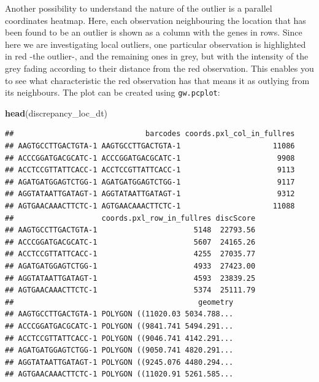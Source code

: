 \documentclass[
]{book}
\newenvironment{Shaded}{\begin{snugshade}}{\end{snugshade}}
\newcommand{\FunctionTok}[1]{\textcolor[rgb]{0.13,0.29,0.53}{\textbf{#1}}}
\newcommand{\NormalTok}[1]{#1}
\begin{document}
Another possibility to understand the nature of the outlier is a parallel coordinates heatmap. Here, each observation neighbouring the location that has been found to be an outlier is shown as a column with the genes in rows. Since here we are investigating local outliers, one particular observation is highlighted in red -the outlier-, and the remaining ones in grey, but with the intensity of the grey fading according to their distance from the red observation. This enables you to see what characteristic the red observation has that means it as outlying from its neighbours. The plot can be created using \texttt{gw.pcplot}:

\begin{Shaded}
\begin{Highlighting}[]
\FunctionTok{head}\NormalTok{(discrepancy\_loc\_dt)}
\end{Highlighting}
\end{Shaded}

\begin{verbatim}
##                              barcodes coords.pxl_col_in_fullres
## AAGTGCCTTGACTGTA-1 AAGTGCCTTGACTGTA-1                     11086
## ACCCGGATGACGCATC-1 ACCCGGATGACGCATC-1                      9908
## ACCTCCGTTATTCACC-1 ACCTCCGTTATTCACC-1                      9113
## AGATGATGGAGTCTGG-1 AGATGATGGAGTCTGG-1                      9117
## AGGTATAATTGATAGT-1 AGGTATAATTGATAGT-1                      9312
## AGTGAACAAACTTCTC-1 AGTGAACAAACTTCTC-1                     11088
##                    coords.pxl_row_in_fullres discScore
## AAGTGCCTTGACTGTA-1                      5148  22793.56
## ACCCGGATGACGCATC-1                      5607  24165.26
## ACCTCCGTTATTCACC-1                      4255  27035.77
## AGATGATGGAGTCTGG-1                      4933  27423.00
## AGGTATAATTGATAGT-1                      4593  23839.25
## AGTGAACAAACTTCTC-1                      5374  25111.79
##                                          geometry
## AAGTGCCTTGACTGTA-1 POLYGON ((11020.03 5034.788...
## ACCCGGATGACGCATC-1 POLYGON ((9841.741 5494.291...
## ACCTCCGTTATTCACC-1 POLYGON ((9046.741 4142.291...
## AGATGATGGAGTCTGG-1 POLYGON ((9050.741 4820.291...
## AGGTATAATTGATAGT-1 POLYGON ((9245.076 4480.294...
## AGTGAACAAACTTCTC-1 POLYGON ((11020.91 5261.585...
\end{verbatim}
\end{document}
